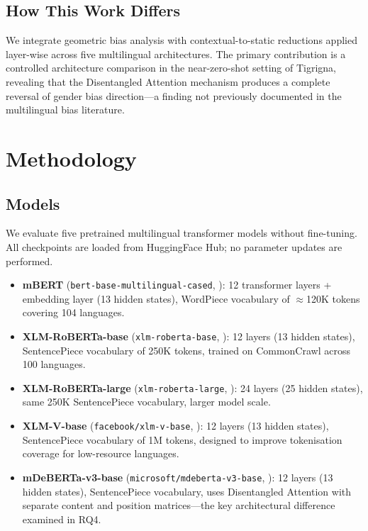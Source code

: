 \documentclass[10pt]{article}
\begin{document}
\subsection{How This Work Differs}

We integrate geometric bias analysis \citep{bolukbasi2016man} with contextual-to-static
reductions \citep{bommasani2020reductions} applied layer-wise across five
multilingual architectures. The primary contribution is a controlled
architecture comparison in the near-zero-shot setting of Tigrigna, revealing
that the Disentangled Attention mechanism produces a complete reversal of gender
bias direction---a finding not previously documented in the multilingual bias
literature.

\section{Methodology}

\subsection{Models}

We evaluate five pretrained multilingual transformer models without fine-tuning.
All checkpoints are loaded from HuggingFace Hub; no parameter updates are
performed.

\begin{itemize}[noitemsep,leftmargin=*]
  \item \textbf{mBERT} (\texttt{bert-base-multilingual-cased},
        \citealt{devlin2019bert}): 12 transformer layers + embedding layer
        (13 hidden states), WordPiece vocabulary of $\approx$120K tokens
        covering 104 languages.
  \item \textbf{XLM-RoBERTa-base} (\texttt{xlm-roberta-base},
        \citealt{conneau2020unsupervised}): 12 layers (13 hidden
        states), SentencePiece vocabulary of 250K tokens, trained on
        CommonCrawl across 100 languages.
  \item \textbf{XLM-RoBERTa-large} (\texttt{xlm-roberta-large},
        \citealt{conneau2020unsupervised}): 24 layers (25 hidden
        states), same 250K SentencePiece vocabulary, larger model scale.
  \item \textbf{XLM-V-base} (\texttt{facebook/xlm-v-base},
        \citealt{liang2023xlmv}): 12 layers (13 hidden states),
        SentencePiece vocabulary of 1M tokens, designed to improve
        tokenisation coverage for low-resource languages.
  \item \textbf{mDeBERTa-v3-base} (\texttt{microsoft/mdeberta-v3-base},
        \citealt{he2021deberta}): 12 layers (13 hidden states),
        SentencePiece vocabulary, uses Disentangled Attention with separate
        content and position matrices---the key architectural difference
        examined in RQ4.
\end{itemize}
\end{document}
